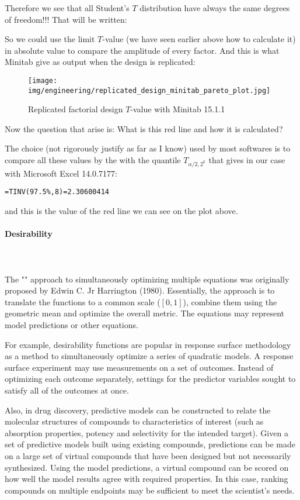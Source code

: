 	Therefore we see that all Student's $T$ distribution have always the same degrees of freedom!!! That will be written:
	
	So we could use the limit $T$-value (we have seen earlier above how to calculate it) in absolute value to compare the amplitude of every factor. And this is what Minitab give as output when the design is replicated:
	\begin{figure}[H]
		\centering
		\texttt{[image: img/engineering/replicated\_design\_minitab\_pareto\_plot.jpg]}
		\caption[]{Replicated factorial design $T$-value with Minitab 15.1.1}
	\end{figure}
	Now the question that arise is: What is this red line and how it is calculated?
	
	The choice (not rigorously justify as far as I know) used by most softwares is to compare all these values by the with the quantile $T_{\alpha/2,2^k}$ that gives in our case with Microsoft Excel 14.0.7177:
	\begin{center}
		\texttt{=TINV(97.5\%,8)=2.30600414}
	\end{center}
	and this is the value of the red line we can see on the plot above.
	
	\paragraph{Desirability}\mbox{}\\\\
	The "" approach to simultaneously optimizing multiple equations was originally proposed by Edwin C. Jr Harrington (1980). Essentially, the approach is to translate the functions to a common scale ($[0, 1]$), combine them using the geometric mean and optimize the overall metric. The equations may represent model predictions or other equations.

	For example, desirability functions are popular in response surface methodology as a method to simultaneously optimize a series of quadratic models. A response surface experiment may use measurements on a set of outcomes. Instead of optimizing each outcome separately, settings for the predictor variables sought to satisfy all of the outcomes at once.

	Also, in drug discovery, predictive models can be constructed to relate the molecular structures of compounds to characteristics of interest (such as absorption properties, potency and selectivity for the intended target). Given a set of predictive models built using existing compounds, predictions can be made on a large set of virtual compounds that have been designed but not necessarily synthesized. Using the model predictions, a virtual compound can be scored on how well the model results agree with required properties. In this case, ranking compounds on multiple endpoints may be sufficient to meet the scientist's needs.
	
